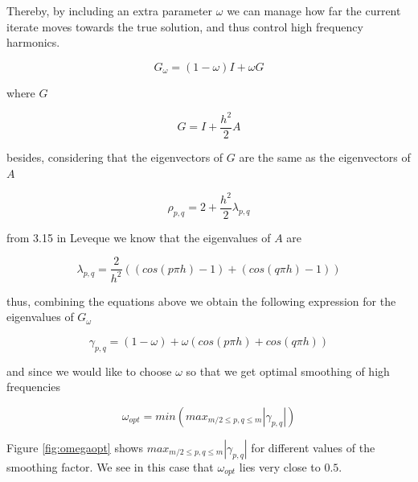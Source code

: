 \documentclass[main.tex]{subfiles}
\begin{document}
Thereby, by including an extra parameter $\omega$ we can manage how far the current iterate moves towards the true solution, and thus control high frequency harmonics.

\begin{equation}
G_\omega = (1-\omega)I + \omega G
\end{equation} 

where $G$

\begin{equation}
G = I + \frac{h^2}{2} A
\end{equation}

besides, considering that the eigenvectors of $G$ are the same as the eigenvectors of $A$

\begin{equation}
\rho_{p,q} = 2 + \frac{h^2}{2} \lambda_{p,q}
\end{equation}

from 3.15 in Leveque we know that the eigenvalues of $A$ are

\begin{equation}
\lambda_{p,q} = \frac{2}{h^2}((cos(p \pi h) -1) + (cos(q \pi h) -1 ))
\end{equation}

thus, combining the equations above we obtain the following expression for the eigenvalues of $G_\omega$

\begin{equation}
\gamma_{p,q} = (1-\omega) + \omega ( cos(p \pi h) + cos(q \pi h))
\end{equation}

and since we would like to choose $\omega$ so that we get optimal smoothing of high frequencies

\begin{equation}
\omega_{opt} = min ( max_{m/2 \leq p,q \leq m} |\gamma_{p,q}|)
\end{equation}

Figure \ref{fig:omegaopt} shows $max_{m/2 \leq p,q \leq m} |\gamma_{p,q}|$ for different values of the smoothing factor. We see in this case that $\omega_{opt}$ lies very close to $0.5$.
\end{document}
